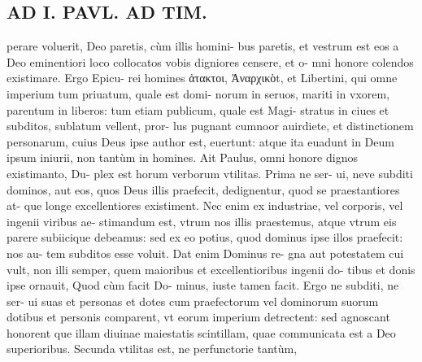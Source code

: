 \documentclass{article}
\begin{document}
\begin{pages}
\section*{AD I. PAVL. AD TIM. }
\marginpar{[ p.414 ]}\pstart perare voluerit, Deo paretis, cùm illis homini- bus paretis, et vestrum est eos a Deo eminentiori loco collocatos vobis digniores censere, et o- mni honore colendos existimare. Ergo Epicu- rei homines ἀτακτοι, Ἀναρχικὸt, et Libertini, qui omne imperium tum priuatum, quale est domi- norum in seruos, mariti in vxorem, parentum in liberos: tum etiam publicum, quale est Magi- stratus in ciues et subditos, sublatum vellent, pror- lus pugnant cumnoor auirdiete, et distinctionem personarum, cuius Deus ipse author est, euertunt: atque ita euadunt in Deum ipsum iniurii, non tantùm in homines.  \pend\pstart Ait Paulus, omni honore dignos existimanto, Du- plex est horum verborum vtilitas. Prima ne ser- ui, neve subditi dominos, aut eos, quos Deus illis praefecit, dedignentur, quod se praestantiores at- que longe excellentiores existiment. Nec enim ex industriae, vel corporis, vel ingenii viribus ae- stimandum est, vtrum nos illis praestemus, atque vtrum eis parere subiicique debeamus: sed ex eo potius, quod dominus ipse illos praefecit: nos au- tem subditos esse voluit. Dat enim Dominus re- gna aut potestatem cui vult, non illi semper, quem maioribus et excellentioribus ingenii do- tibus et donis ipse ornauit, Quod cùm facit Do- minus, iuste tamen facit. Ergo ne subditi, ne ser- ui suas et personas et dotes cum praefectorum vel dominorum suorum dotibus et personis comparent, vt eorum imperium detrectent: sed agnoscant honorent que illam diuinae maiestatis scintillam, quae communicata est a Deo superioribus.  \pend\pstart Secunda vtilitas est, ne perfunctorie tantùm,  \pend

\end{pages}
\end{document}
